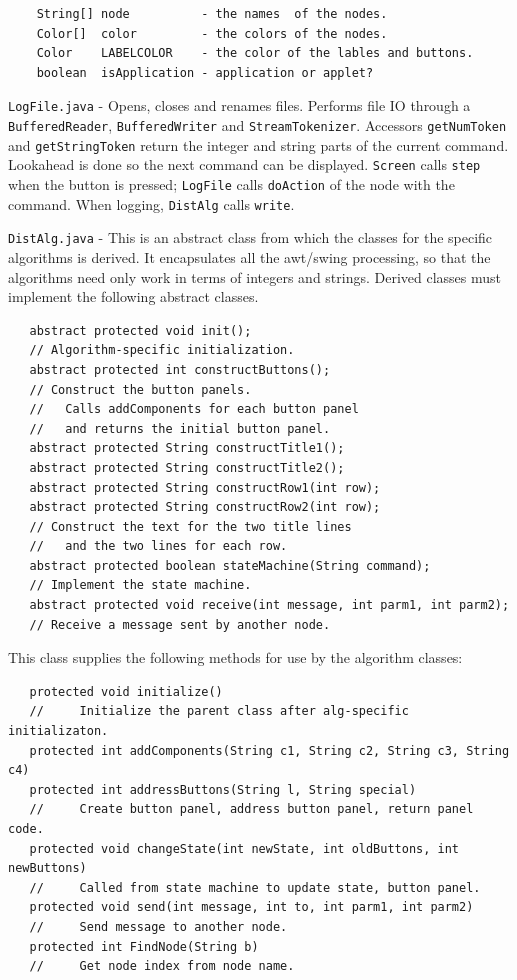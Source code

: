 \documentclass[11pt]{article}
\newcommand{\p}[1]{\texttt{#1}}
\begin{document}
\begin{verbatim}
    String[] node          - the names  of the nodes.
    Color[]  color         - the colors of the nodes.
    Color    LABELCOLOR    - the color of the lables and buttons.
    boolean  isApplication - application or applet?
\end{verbatim}

\p{LogFile.java} - Opens, closes and renames files. Performs file
IO through a \p{BufferedReader}, \p{BufferedWriter} and
\p{StreamTokenizer}. Accessors \p{getNumToken} and
\p{getStringToken} return the integer and string parts of the
current command. Lookahead is done so the next command can be
displayed. \p{Screen} calls \p{step} when the button is pressed;
\p{LogFile} calls \p{doAction} of the node with the command.
When logging, \p{DistAlg} calls \p{write}.

\p{DistAlg.java} - This is an abstract class from which the
classes for the specific algorithms is derived. It encapsulates
all the awt/swing processing, so that the algorithms need only
work in terms of integers and strings. Derived classes must
implement the following abstract classes.

\begin{verbatim}
   abstract protected void init();
   // Algorithm-specific initialization.
   abstract protected int constructButtons();
   // Construct the button panels.
   //   Calls addComponents for each button panel
   //   and returns the initial button panel.
   abstract protected String constructTitle1();
   abstract protected String constructTitle2();
   abstract protected String constructRow1(int row);
   abstract protected String constructRow2(int row);
   // Construct the text for the two title lines
   //   and the two lines for each row.
   abstract protected boolean stateMachine(String command);
   // Implement the state machine.
   abstract protected void receive(int message, int parm1, int parm2);
   // Receive a message sent by another node.
\end{verbatim}

This class supplies the following methods
for use by the algorithm classes:

\begin{verbatim}
   protected void initialize()
   //     Initialize the parent class after alg-specific initializaton.
   protected int addComponents(String c1, String c2, String c3, String c4)
   protected int addressButtons(String l, String special)
   //     Create button panel, address button panel, return panel code.
   protected void changeState(int newState, int oldButtons, int newButtons)
   //     Called from state machine to update state, button panel.
   protected void send(int message, int to, int parm1, int parm2)
   //     Send message to another node.
   protected int FindNode(String b)
   //     Get node index from node name.
\end{verbatim}
\end{document}
